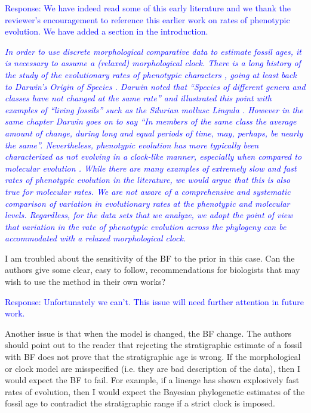 \documentclass[11pt]{article}
\newcommand{\response}[1]{\medskip{}\textcolor{blue}{{Response: #1}}\medskip{}}
\newcommand{\respquote}[1]{{\medskip{}\textcolor{blue}{{\it #1}}\medskip{}}}
\begin{document}
\response{We have indeed read some of this early literature and we thank the reviewer's encouragement to reference this earlier work on rates of phenotypic evolution. We have added a section in the introduction.}


\respquote{In order to use discrete morphological comparative data to estimate fossil ages, it is necessary to assume a (relaxed) morphological clock. There is a long history of the study of the evolutionary rates of phenotypic characters \cite{Simpson1944,Haldane1949,Simpson1953,Gingerich1983,Gingerich1993}, going at least back to Darwin's Origin of Species \cite{Darwin1859}. Darwin noted that {\it ``Species of different genera and classes have not changed at the same rate''} and illustrated this point with examples of ``living fossils'' such as the Silurian mollusc {\it Lingula} \cite{Darwin1859}. However in the same chapter Darwin goes on to say {\it ``In members of the same class the average amount of change, during long and equal periods of time, may, perhaps, be nearly the same''}. Nevertheless, phenotypic evolution has more typically been characterized as not evolving in a clock-like manner, especially when compared to molecular evolution \cite{Kimura1983}. While there are many examples of extremely slow and fast rates of phenotypic evolution in the literature, we would argue that this is also true for molecular rates. We are not aware of a comprehensive and systematic comparison of variation in evolutionary rates at the phenotypic and molecular levels. Regardless, for the data sets that we analyze, we adopt the point of view that variation in the rate of phenotypic evolution across the phylogeny can be accommodated with a relaxed morphological clock.
}

I am troubled about the sensitivity of the BF to the prior in this case. Can the authors give some clear, easy to follow, recommendations for biologists that may wish to use the method in their own works? 

\response{Unfortunately we can't. This issue will need further attention in future work.}

Another issue is that when the model is changed, the BF change. The authors should point out to the reader that rejecting the stratigraphic estimate of a fossil with BF does not prove that the stratigraphic age is wrong. If the morphological or clock model are misspecified (i.e. they are  bad description of the data), then I would expect the BF to fail. For example, if a lineage has shown explosively fast rates of evolution, then I would expect the Bayesian phylogenetic estimates of the fossil age to contradict the stratigraphic range if a strict clock is imposed.
\end{document}
